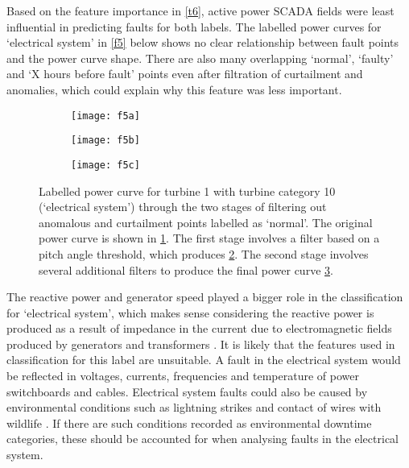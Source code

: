 Based on the feature importance in \autoref{t6}, active power SCADA fields were least influential in predicting faults for both labels. The labelled power curves for `electrical system' in \autoref{f5} below shows no clear relationship between fault points and the power curve shape. There are also many overlapping `normal', `faulty' and `X hours before fault' points even after filtration of curtailment and anomalies, which could explain why this feature was less important.

\begin{figure}
  \centering
  \begin{subfigure}[t]{.5\textwidth}
    \centering
    \texttt{[image: f5a]}
    \caption{\label{f5a}}
  \end{subfigure}%
  \begin{subfigure}[t]{.5\textwidth}
    \centering
    \texttt{[image: f5b]}
    \caption{\label{f5b}}
  \end{subfigure}
  \begin{subfigure}[t]{.5\textwidth}
    \centering
    \texttt{[image: f5c]}
    \caption{\label{f5c}}
  \end{subfigure}
  \caption{\label{f5}Labelled power curve for turbine 1 with turbine category 10 (`electrical system') through the two stages of filtering out anomalous and curtailment points labelled as `normal'. The original power curve is shown in \ref{f5a}. The first stage involves a filter based on a pitch angle threshold, which produces \ref{f5b}. The second stage involves several additional filters to produce the final power curve \ref{f5c}.}
\end{figure}

The reactive power and generator speed played a bigger role in the classification for `electrical system', which makes sense considering the reactive power is produced as a result of impedance in the current due to electromagnetic fields produced by generators and transformers \cite{React}. It is likely that the features used in classification for this label are unsuitable. A fault in the electrical system would be reflected in voltages, currents, frequencies \cite{Overb} and temperature of power switchboards and cables. Electrical system faults could also be caused by environmental conditions such as lightning strikes and contact of wires with wildlife \cite{Overb}. If there are such conditions recorded as environmental downtime categories, these should be accounted for when analysing faults in the electrical system.

